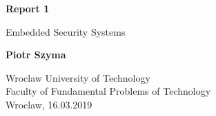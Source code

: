 \begin{titlepage}
  \begin{center}
      \vspace*{1cm}

      \textbf{Report 1}

      \vspace{0.5cm}
       Embedded Security Systems

      \vspace{1.5cm}

      \textbf{Piotr Szyma}

      \vfill

      \vspace{0.8cm}

      Wroclaw University of Technology\\
      Faculty of Fundamental Problems of Technology\\
      Wroclaw, 16.03.2019

  \end{center}
\end{titlepage}